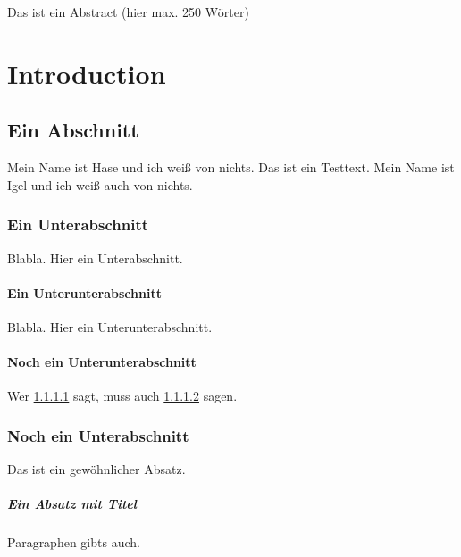 \documentclass[11pt,a4paper,twoside,openright]{scrbook}
\begin{document}
\deckblatt

\pagestyle{scrheadings}

\erklaerung

\thispagestyle{scrplain}
\noindent
Das ist ein Abstract (hier max. 250 Wörter)


\tableofcontents


\chapter{Introduction}
\cite{irbook}
\section{Ein Abschnitt}

Mein Name ist Hase und ich weiß von nichts. Das ist ein Testtext. Mein Name ist
Igel und ich weiß auch von nichts.

\subsection{Ein Unterabschnitt}
Blabla. Hier ein Unterabschnitt.

\subsubsection{Ein Unterunterabschnitt}
\label{sec:a}
Blabla. Hier ein Unterunterabschnitt.

\subsubsection{Noch ein Unterunterabschnitt}
\label{sec:b}

Wer \ref{sec:a} sagt, muss auch \ref{sec:b} sagen.

\subsection{Noch ein Unterabschnitt}

Das ist ein gewöhnlicher Absatz.

\paragraph{Ein Absatz mit Titel}
Paragraphen gibts auch.
\end{document}
